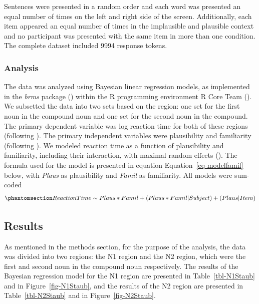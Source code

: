 \documentclass[
  12pt,
  letterpaper,
]{scrreprt}
\begin{document}
Sentences were presented in a random order and each word was presented
an equal number of times on the left and right side of the screen.
Additionally, each item appeared an equal number of times in the
implausible and plausible context and no participant was presented with
the same item in more than one condition. The complete dataset included
9994 response tokens.

\subsubsection{Analysis}\label{analysis}

The data was analyzed using Bayesian linear regression models, as
implemented in the \emph{brms} package
() within
the R programming environment R Core Team
(). We subsetted the data into two sets
based on the region: one set for the first noun in the compound noun and
one set for the second noun in the compound. The primary dependent
variable was log reaction time for both of these regions (following
). The primary
independent variables were plausibility and familiarity (following
). We
modeled reaction time as a function of plausibility and familiarity,
including their interaction, with maximal random effects
(). The
formula used for the model is presented in equation
Equation~\ref{eq-modelfamil} below, with \emph{Plaus} as plausibility
and \emph{Famil} as familiarity. All models were sum-coded
\begin{equation}\phantomsection\label{eq-modelfamil}{
Reaction Time \sim Plaus*Famil+(Plaus*Famil|Subject)+(Plaus|Item)
}\end{equation}

\subsection{Results}\label{results}

As mentioned in the methods section, for the purpose of the analysis,
the data was divided into two regions: the N1 region and the N2 region,
which were the first and second noun in the compound noun respectively.
The results of the Bayesian regression model for the N1 region are
presented in Table~\ref{tbl-N1Staub} and in Figure~\ref{fig-N1Staub},
and the results of the N2 region are presented in
Table~\ref{tbl-N2Staub} and in Figure~\ref{fig-N2Staub}.
\end{document}
